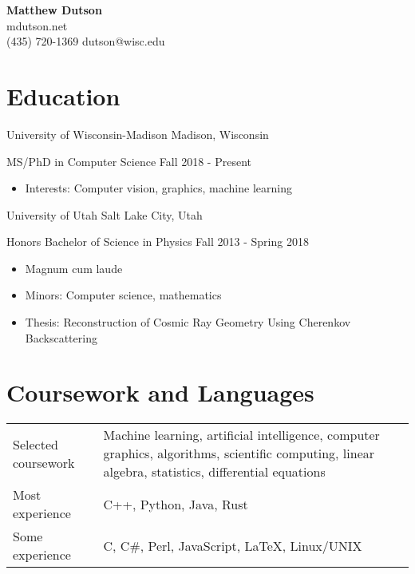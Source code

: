 




\setfont
\pagestyle{empty}


\begin{center}
    {\LARGE \bfseries Matthew Dutson}\\
    \medskip
    mdutson.net\\
    (435) 720-1369 \enspace dutson@wisc.edu
\end{center}


\section*{Education}

\begin{tab1} University of Wisconsin-Madison \> Madison, Wisconsin \end{tab1}
\begin{tab2} MS/PhD in Computer Science \> Fall 2018 - Present \end{tab2}

\begin{itemize}
    \item Interests: Computer vision, graphics, machine learning
\end{itemize}

\blockskip

\begin{tab1} University of Utah \> Salt Lake City, Utah \end{tab1}
\begin{tab2} Honors Bachelor of Science in Physics \> Fall 2013 - Spring 2018 \end{tab2}

\begin{itemize}
    \item Magnum cum laude
    \item Minors: Computer science, mathematics
    \item Thesis: Reconstruction of Cosmic Ray Geometry Using Cherenkov Backscattering
\end{itemize}


\section*{Coursework and Languages}

\begin{tabular}{ @{} p{1.75in} p{5.5in} }
Selected coursework & Machine learning, artificial intelligence, computer graphics, algorithms, scientific computing, linear algebra, statistics, differential equations \\
Most experience & C++, Python, Java, Rust \\
Some experience & C, C\#, Perl, JavaScript, LaTeX, Linux/UNIX
\end{tabular}


